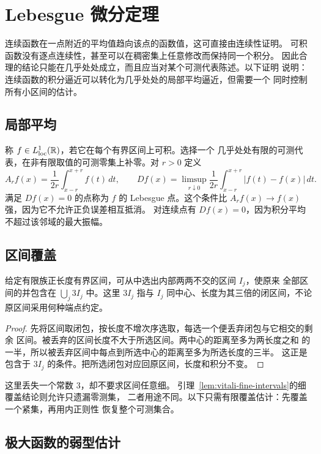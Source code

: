 \chapter{Lebesgue 微分定理}
\label{chap:lebesgue-differentiation}

连续函数在一点附近的平均值趋向该点的函数值，这可直接由连续性证明。
可积函数没有逐点连续性，甚至可以在稠密集上任意修改而保持同一个积分。
因此合理的结论只能在几乎处处成立，而且应当对某个可测代表陈述。以下证明
说明：连续函数的积分逼近可以转化为几乎处处的局部平均逼近，但需要一个
同时控制所有小区间的估计。

\section{局部平均}

称 \(f\in L^1_{\mathrm{loc}}(\mathbb{R})\)，若它在每个有界区间上可积。选择一个
几乎处处有限的可测代表，在非有限取值的可测零集上补零。对 \(r>0\) 定义
\[
 A_r f(x)=\frac1{2r}\int_{x-r}^{x+r}f(t)\,dt,\qquad
 Df(x)=\limsup_{r\downarrow0}\frac1{2r}\int_{x-r}^{x+r}|f(t)-f(x)|\,dt.
\]
满足 \(Df(x)=0\) 的点称为 \(f\) 的 Lebesgue 点。这个条件比
\(A_rf(x)\to f(x)\) 强，因为它不允许正负误差相互抵消。
对连续点有 \(Df(x)=0\)，因为积分平均不超过该邻域的最大振幅。

\section{区间覆盖}

\begin{lemma}[有限三倍覆盖]\label{lem:three-interval-cover}
给定有限族正长度有界区间，可从中选出内部两两不交的区间 \(I_j\)，使原来
全部区间的并包含在 \(\bigcup_j3I_j\) 中。这里 \(3I_j\) 指与 \(I_j\)
同中心、长度为其三倍的闭区间，不论原区间采用何种端点约定。
\end{lemma}
\begin{proof}
先将区间取闭包，按长度不增次序选取，每选一个便丢弃闭包与它相交的剩余
区间。被丢弃的区间长度不大于所选区间。两中心的距离至多为两长度之和
的一半，所以被丢弃区间中每点到所选中心的距离至多为所选长度的三半。
这正是包含于 \(3I_j\) 的条件。把所选闭包对应回原区间，长度和积分不变。
\end{proof}

这里丢失一个常数 \(3\)，却不要求区间任意细。
引理~\ref{lem:vitali-fine-intervals}的细覆盖结论则允许只遗漏零测集，
二者用途不同。以下只需有限覆盖估计：先覆盖一个紧集，再用内正则性
恢复整个可测集合。

\section{极大函数的弱型估计}

